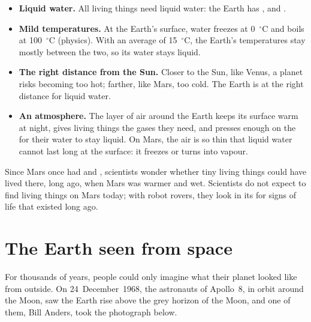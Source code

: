 \begin{itemize}
  \item \textbf{Liquid water.} All living things need liquid water: the
        Earth has ,  and .
  \item \textbf{Mild temperatures.} At the Earth's surface, water freezes
        at 0~$^\circ$C and boils at 100~$^\circ$C (physics). With an
        average of 15~$^\circ$C, the Earth's temperatures stay mostly
        between the two, so its water stays liquid.
  \item \textbf{The right distance from the Sun.} Closer to the Sun, like
        Venus, a planet risks becoming too hot; farther, like Mars, too
        cold. The Earth is at the right distance for liquid water.
  \item \textbf{An atmosphere.} The layer of air around the Earth keeps its
        surface warm at night, gives living things the gases they need, and
        presses enough on the  for their water to stay liquid. On
        Mars, the air is so thin that liquid water cannot last long at the
        surface: it freezes or turns into vapour.
\end{itemize}

\begin{remark}\label{rem:g6:earth-a-planet:mars-life}
Since Mars once had  and , scientists wonder whether tiny living
things could have lived there, long ago, when Mars was warmer and wet.
Scientists do not expect to find living things on Mars today; with robot
rovers, they look in its  for signs of life that existed long ago.
\end{remark}

\section{The Earth seen from space}

For thousands of years, people could only imagine what their planet looked
like from outside. On 24~December~1968, the astronauts of Apollo~8,
in orbit around the Moon, saw the Earth rise above the grey horizon of
the Moon, and one of them, Bill Anders, took the photograph below.

